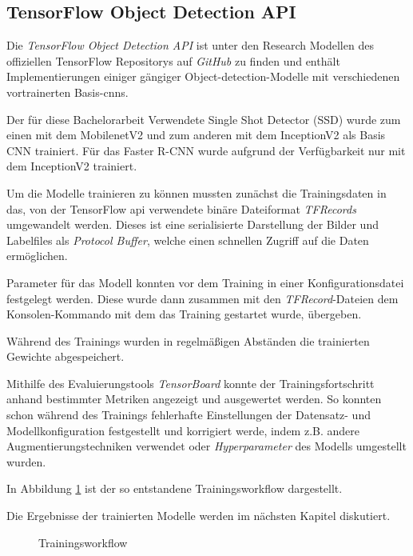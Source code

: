 \subsection{TensorFlow Object Detection API}

Die \textit{TensorFlow Object Detection API} ist unter den
Research Modellen des offiziellen TensorFlow
Repositorys auf \textit{GitHub} zu finden \cite{tfobjdet}
und enthält Implementierungen
einiger gängiger Object-detection-Modelle mit verschiedenen 
vortrainerten Basis-\Glspl{cnn}.

Der für diese Bachelorarbeit Verwendete Single 
Shot Detector (SSD) wurde zum einen mit dem 
MobilenetV2 und zum anderen mit dem 
InceptionV2 als Basis CNN trainiert.
Für das Faster R-CNN wurde aufgrund 
der Verfügbarkeit nur mit dem InceptionV2
trainiert.

Um die Modelle trainieren zu können mussten zunächst die 
Trainingsdaten in das, von der TensorFlow \Gls{api}
verwendete binäre Dateiformat \textit{TFRecords} 
umgewandelt werden.
Dieses ist eine serialisierte Darstellung der Bilder
 und Labelfiles als \textit{Protocol Buffer},
welche einen schnellen Zugriff auf die Daten ermöglichen.

Parameter für das Modell konnten vor dem Training 
in einer Konfigurationsdatei festgelegt werden.
Diese wurde dann zusammen mit den \textit{TFRecord}-Dateien 
dem Konsolen-Kommando mit dem das Training 
gestartet wurde, übergeben.

Während des Trainings wurden in regelmäßigen 
Abständen die trainierten Gewichte abgespeichert.

Mithilfe des Evaluierungstools \textit{TensorBoard}
konnte der Trainingsfortschritt anhand bestimmter
Metriken angezeigt und ausgewertet werden. So konnten schon während des Trainings fehlerhafte
Einstellungen der Datensatz- und 
Modellkonfiguration festgestellt 
und korrigiert werde, indem z.B. andere
Augmentierungstechniken verwendet
oder \textit{Hyperparameter} des
Modells umgestellt wurden.

In Abbildung \ref{fig:train_workflow}
ist der so entstandene Trainingsworkflow dargestellt.

Die Ergebnisse der trainierten Modelle 
werden im nächsten Kapitel diskutiert.
\vspace{1cm}

\begin{figure}[H]
    \centering
    
    \caption{Trainingsworkflow}
    \label{fig:train_workflow}
\end{figure}
\vspace{1cm}



